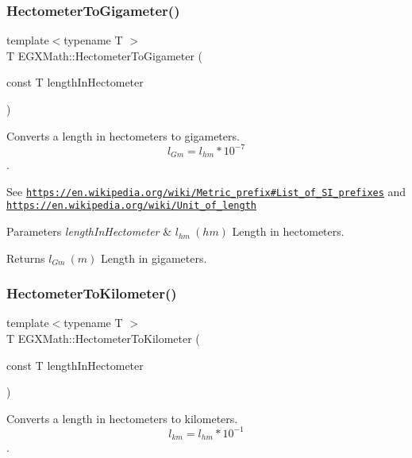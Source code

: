 \subsubsection{\texorpdfstring{Hectometer\+To\+Gigameter()}{HectometerToGigameter()}}
{\footnotesize\ttfamily template$<$typename T $>$ \\
T E\+G\+X\+Math\+::\+Hectometer\+To\+Gigameter (\begin{DoxyParamCaption}\item[{const T}]{length\+In\+Hectometer }\end{DoxyParamCaption})}



Converts a length in hectometers to gigameters. \[ l_{Gm}=l_{hm} * 10^{-7} \]. 

See \href{https://en.wikipedia.org/wiki/Metric_prefix#List_of_SI_prefixes}{\tt https\+://en.\+wikipedia.\+org/wiki/\+Metric\+\_\+prefix\#\+List\+\_\+of\+\_\+\+S\+I\+\_\+prefixes} and \href{https://en.wikipedia.org/wiki/Unit_of_length}{\tt https\+://en.\+wikipedia.\+org/wiki/\+Unit\+\_\+of\+\_\+length} 
\begin{DoxyParams}{Parameters}
{\em length\+In\+Hectometer} & $ l_{hm}\ (hm)$ Length in hectometers. \\
\hline
\end{DoxyParams}
\begin{DoxyReturn}{Returns}
$ l_{Gm}\ (m)$ Length in gigameters. 
\end{DoxyReturn}
\mbox{\label{group___e_g_x_math-_conversions-_length_conversions-_hectometer-_s_i_ga38aeefced1e25e531c306bae511786bb}} 
\subsubsection{\texorpdfstring{Hectometer\+To\+Kilometer()}{HectometerToKilometer()}}
{\footnotesize\ttfamily template$<$typename T $>$ \\
T E\+G\+X\+Math\+::\+Hectometer\+To\+Kilometer (\begin{DoxyParamCaption}\item[{const T}]{length\+In\+Hectometer }\end{DoxyParamCaption})}



Converts a length in hectometers to kilometers. \[ l_{km}=l_{hm} * 10^{-1} \]. 

